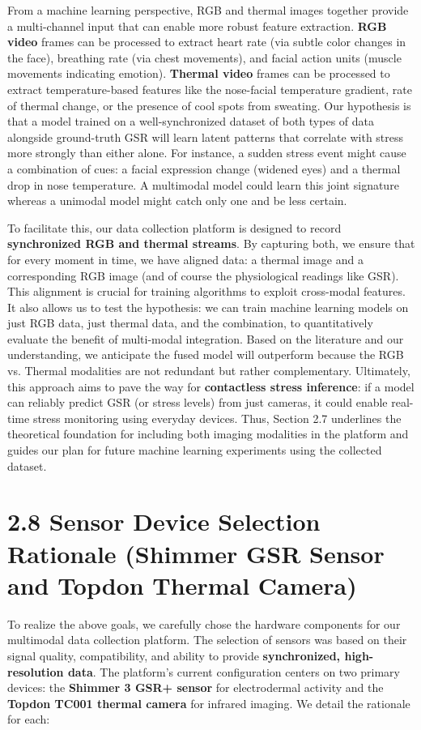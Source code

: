 From a machine learning perspective, RGB and thermal images together
provide a multi-channel input that can enable more robust feature
extraction. \textbf{RGB video} frames can be processed to extract heart rate
(via subtle color changes in the face), breathing rate (via chest
movements), and facial action units (muscle movements indicating
emotion). \textbf{Thermal video} frames can be processed to extract
temperature-based features like the nose-facial temperature gradient,
rate of thermal change, or the presence of cool spots from sweating. Our
hypothesis is that a model trained on a well-synchronized dataset of
both types of data alongside ground-truth GSR will learn latent patterns
that correlate with stress more strongly than either alone. For
instance, a sudden stress event might cause a combination of cues: a
facial expression change (widened eyes) and a thermal drop in nose
temperature. A multimodal model could learn this joint signature whereas
a unimodal model might catch only one and be less certain.

To facilitate this, our data collection platform is designed to record
\textbf{synchronized RGB and thermal streams}. By capturing both, we ensure
that for every moment in time, we have aligned data: a thermal image and
a corresponding RGB image (and of course the physiological readings like
GSR). This alignment is crucial for training algorithms to exploit
cross-modal features. It also allows us to test the hypothesis: we can
train machine learning models on just RGB data, just thermal data, and
the combination, to quantitatively evaluate the benefit of multi-modal
integration. Based on the literature and our understanding, we
anticipate the fused model will outperform because the RGB vs. Thermal
modalities are not redundant but rather complementary. Ultimately, this
approach aims to pave the way for \textbf{contactless stress inference}: if a
model can reliably predict GSR (or stress levels) from just cameras, it
could enable real-time stress monitoring using everyday devices. Thus,
Section 2.7 underlines the theoretical foundation for including both
imaging modalities in the platform and guides our plan for future
machine learning experiments using the collected dataset.

\section{2.8 Sensor Device Selection Rationale (Shimmer GSR Sensor and Topdon Thermal Camera)}

To realize the above goals, we carefully chose the hardware components
for our multimodal data collection platform. The selection of sensors
was based on their signal quality, compatibility, and ability to provide
\textbf{synchronized, high-resolution data}. The platform's current
configuration centers on two primary devices: the \textbf{Shimmer 3 GSR+
sensor} for electrodermal activity and the \textbf{Topdon TC001 thermal
camera} for infrared imaging. We detail the rationale for each:

